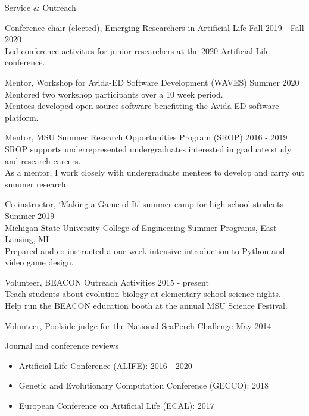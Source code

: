 \begin{rSection}{Service \& Outreach}

Conference chair (elected), Emerging Researchers in Artificial Life
\hfill Fall 2019 - Fall 2020 \\
\tab Led conference activities for junior researchers at the 2020 Artificial Life conference.

Mentor, Workshop for Avida-ED Software Development (WAVES)
\hfill Summer 2020 \\
\tab Mentored two workshop participants over a 10 week period. \\
\tab Mentees developed open-source software benefitting the Avida-ED software platform.

Mentor, MSU Summer Research Opportunities Program (SROP)
\hfill 2016 - 2019 \\
\tab SROP supports underrepresented undergraduates interested in graduate study and research careers. \\
\tab As a mentor, I work closely with undergraduate mentees to develop and carry out summer research.

Co-instructor, `Making a Game of It' summer camp for high school students
\hfill Summer 2019 \\
\tab Michigan State University College of Engineering Summer Programs, East Lansing, MI \\
\tab Prepared and co-instructed a one week intensive introduction to Python and video game design.

Volunteer, BEACON Outreach Activities
\hfill 2015 - present \\
\tab Teach students about evolution biology at elementary school science nights. \\
\tab Help run the BEACON education booth at the annual MSU Science Festival.

Volunteer, Poolside judge for the National SeaPerch Challenge \hfill May 2014

Journal and conference reviews
\vspace{-0.5em}
\begin{itemize}[noitemsep]
  \item Artificial Life Conference (ALIFE): 2016 - 2020
  \item Genetic and Evolutionary Computation Conference (GECCO): 2018
  \item European Conference on Artificial Life (ECAL): 2017
\end{itemize}

\end{rSection}
